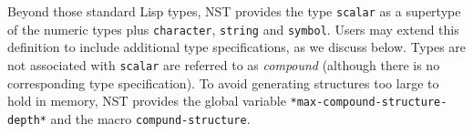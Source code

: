 Beyond those standard Lisp types, NST provides the type
\texttt{scalar} as a supertype of the numeric types plus
\texttt{character}, \texttt{string} and \texttt{symbol}.  Users may
extend this definition to include additional type specifications, as
we discuss below.  Types are not associated with \texttt{scalar} are
referred to as \emph{compound} (although there is no corresponding
type specification).  To avoid generating structures too large to hold
in memory, NST provides the global variable
\texttt{*max-compound-structure-depth*}\label{max-compound-structure-depth}
and the macro \texttt{compund-structure}.


\par


